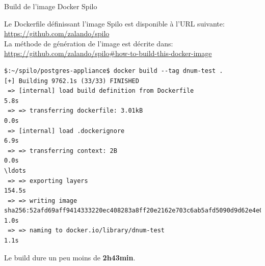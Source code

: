 \begin{frame}[fragile]{Build de l'image Docker Spilo}

   Le Dockerfile définissant l'image Spilo est disponible à l'URL suivante: \url{https://github.com/zalando/spilo} \\

   La méthode de génération de l'image est décrite dans: \url{https://github.com/zalando/spilo#how-to-build-this-docker-image} \\

\begin{tiny}
\begin{Verbatim}[commandchars=\\\#\#]
$:~/spilo/postgres-appliance$ docker build --tag dnum-test .                                                                                                            
[+] Building 9762.1s (33/33) FINISHED                                                                                                                                                         
 => [internal] load build definition from Dockerfile                                                                                                                                     5.8s 
 => => transferring dockerfile: 3.01kB                                                                                                                                                   0.0s 
 => [internal] load .dockerignore                                                                                                                                                        6.9s
 => => transferring context: 2B                                                                                                                                                          0.0s
\ldots
 => => exporting layers                                                                                                                                                                154.5s 
 => => writing image sha256:52afd69aff9414333220ec408283a8ff20e2162e703c6ab5afd5090d9d62e4e0                                                                                             1.0s
 => => naming to docker.io/library/dnum-test                                                                                                                                             1.1s

\end{Verbatim}
\end{tiny}

   Le build dure un peu moins de \textbf{2h43min}.
\end{frame}

